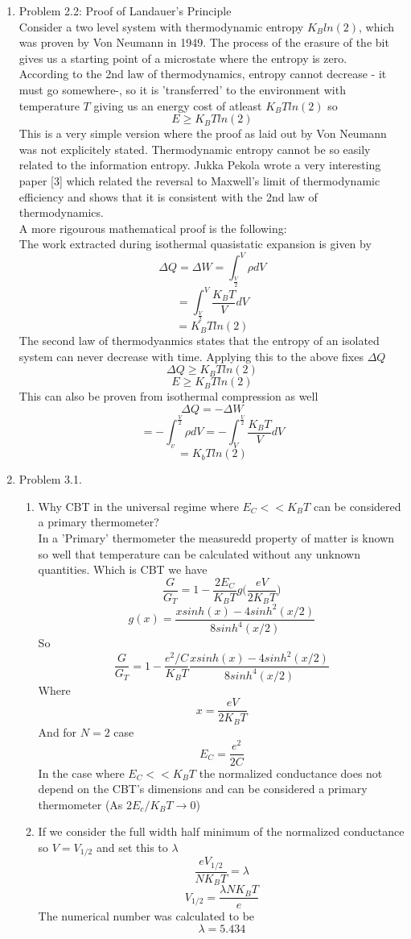 \documentclass[12pt]{article}
\begin{document}
\begin{enumerate}
\item Problem 2.2: Proof of Landauer's Principle
\\
Consider a two level system with thermodynamic entropy $K_B ln(2)$, which was proven by Von Neumann in 1949. The process of the erasure of the bit gives us a starting point of a microstate where the entropy is zero. \\
According to the 2nd law of thermodynamics, entropy cannot decrease - it must go somewhere-, so it is 'transferred' to the environment with temperature $T$ giving us an energy cost of atleast $K_B T ln(2)$ so 
$$ E \geq K_B T ln(2) $$
This is a very simple version where the proof as laid out by Von Neumann was not explicitely stated. Thermodynamic entropy cannot be so easily related to the information entropy. 
Jukka Pekola wrote a very interesting paper [3] which related the reversal to Maxwell's limit of thermodynamic efficiency and shows that it is consistent with the 2nd law of thermodynamics. 
\\
A more rigourous mathematical proof is the following: 
\\
The work extracted during isothermal quasistatic expansion is given by 
$$ \Delta Q = \Delta W = \int_{\frac{V}{2}}^V \rho dV $$
$$ = \int_{\frac{V}{2}}^V \frac{K_B T}{V} dV $$ 
$$ = K_B T ln(2) $$ 
The second law of thermodyanmics states that the entropy of an isolated system can never decrease with time. Applying this to the above fixes $\Delta Q$ 
$$ \Delta Q \geq K_B T ln(2) $$
$$ E \geq K_B T ln(2) $$
This can also be proven from isothermal compression as well 
$$ \Delta Q = - \Delta W $$ 
$$ = - \int_{v}^{\frac{V}{2}} \rho dV = - \int_{V}^{\frac{V}{2}} \frac{K_B T}{V} dV $$
$$ = K_b T ln(2) $$




\item Problem 3.1.
\begin{enumerate}
    \item Why CBT in the universal regime where $ E_C << K_B T $ can be considered a primary thermometer? 
    \\
    In a 'Primary' thermometer the measuredd property of matter is known so well that temperature can be calculated without any unknown quantities. Which is CBT we have 
    $$ \frac{G}{G_T} = 1 - \frac{2E_C}{K_B T} g \big( \frac{eV}{2K_B T}\Big) $$ 
    $$ g(x) = \frac{x sinh(x) - 4sinh^2 (x/2)}{8sinh^4 (x/2)} $$
    So 
    $$ \frac{G}{G_T} = 1 - \frac{e^2/C}{K_B T} \frac{ xsinh(x) - 4sinh^2 (x/2)}{8sinh^4 (x/2)} $$
    Where 
    $$ x = \frac{eV}{2 K_B T} $$
    And for $N=2$ case 
    $$ E_C = \frac{e^2}{2C} $$ 
    In the case where $E_C << K_B T$ the normalized conductance does not depend on the CBT's dimensions and can be considered a primary thermometer (As $2E_c / K_B T \rightarrow 0$)
    \item If we consider the full width half minimum of the normalized conductance so $V = V_{1/2}$ and set this to $\lambda$ 
    $$ \frac{eV_{1/2}}{N K_B T} = \lambda $$
    $$ V_{1/2} = \frac{\lambda N K_B T}{e}$$
    The numerical number was calculated to be 
    $$ \lambda = 5.434 $$ 
    

\end{enumerate}
\end{enumerate}
\end{document}
